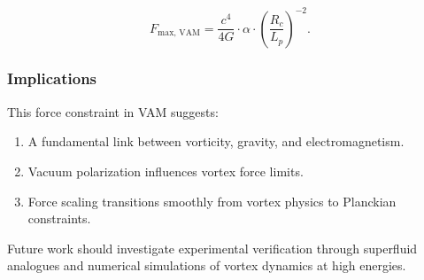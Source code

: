 \begin{equation*}
    F_{\text{max, VAM}} = \frac{c^4}{4G} \cdot \alpha \cdot \left(\frac{R_c}{L_p}\right)^{-2}.
\end{equation*}


\subsubsection*{Implications}
This force constraint in VAM suggests:
\begin{enumerate}
    \item A fundamental link between vorticity, gravity, and electromagnetism.
    \item Vacuum polarization influences vortex force limits.
    \item Force scaling transitions smoothly from vortex physics to Planckian constraints.
\end{enumerate}


Future work should investigate experimental verification through superfluid analogues and numerical simulations of vortex dynamics at high energies.